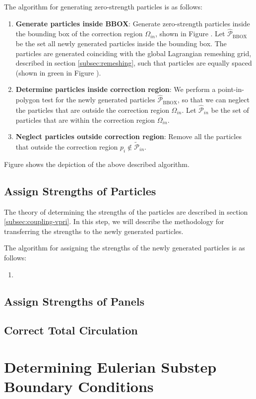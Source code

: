 	The algorithm for generating zero-strength particles is as follows:
	\begin{enumerate}[label=3.\alph*)]
	\item \textbf{Generate particles inside BBOX}: Generate zero-strength particles inside the bounding box of the correction region $\Omega_{in}$, shown in Figure . Let $\hat{\mathcal{P}}_{\mathrm{BBOX}}$ be the set all newly generated particles inside the bounding box. The particles are generated coinciding with the global Lagrangian remeshing grid, described in section \ref{subsec:remeshing}, such that particles are equally spaced (shown in green in Figure ).
	\item \textbf{Determine particles inside correction region}: We perform a point-in-polygon test for the newly generated particles $\hat{\mathcal{P}}_{\mathrm{BBOX}}$, so that we can neglect the particles that are outside the correction region $\Omega_{in}$. Let $\hat{\mathcal{P}}_{in}$ be the set of particles that are within the correction region $\Omega_{in}$.
	\item \textbf{Neglect particles outside correction region}: Remove all the particles that outside the correction region $p_i \notin \tilde{\mathcal{P}}_{in}$.
	\end{enumerate}
	
	Figure  shows the depiction of the above described algorithm.
	
	\subsection{Assign Strengths of Particles}
	\label{subsec:coupling-as}
	
	The theory of determining the strengths of the particles are described in section \ref{subsec:coupling-vpri}. In this step, we will describe the methodology for transferring the strengths to the newly generated particles.
	
	The algorithm for assigning the strengths of the newly generated particles is as follows:
	\begin{enumerate}[label=4.\alph*)]
	\item \textbf{}
	\end{enumerate}
	
	\subsection{Assign Strengths of Panels}	
	
	
	\subsection{Correct Total Circulation}


\section{Determining Eulerian Substep Boundary Conditions}	
\label{sec:coupling-desbc}

	
	
	


